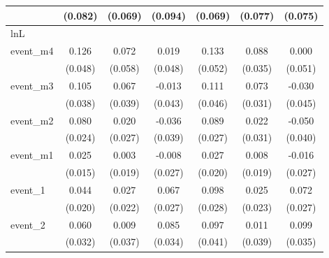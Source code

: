 {\begin{tabular}{l*{6}{c}}
            &     (0.082)         &     (0.069)         &     (0.094)         &     (0.069)         &     (0.077)         &     (0.075)         \\
\hline
lnL         &                     &                     &                     &                     &                     &                     \\
event\_m4    &       0.126\sym{**} &       0.072         &       0.019         &       0.133\sym{*}  &       0.088\sym{*}  &       0.000         \\
            &     (0.048)         &     (0.058)         &     (0.048)         &     (0.052)         &     (0.035)         &     (0.051)         \\
[1em]
event\_m3    &       0.105\sym{**} &       0.067         &      -0.013         &       0.111\sym{*}  &       0.073\sym{*}  &      -0.030         \\
            &     (0.038)         &     (0.039)         &     (0.043)         &     (0.046)         &     (0.031)         &     (0.045)         \\
[1em]
event\_m2    &       0.080\sym{***}&       0.020         &      -0.036         &       0.089\sym{***}&       0.022         &      -0.050         \\
            &     (0.024)         &     (0.027)         &     (0.039)         &     (0.027)         &     (0.031)         &     (0.040)         \\
[1em]
event\_m1    &       0.025         &       0.003         &      -0.008         &       0.027         &       0.008         &      -0.016         \\
            &     (0.015)         &     (0.019)         &     (0.027)         &     (0.020)         &     (0.019)         &     (0.027)         \\
[1em]
event\_1     &       0.044\sym{*}  &       0.027         &       0.067\sym{*}  &       0.098\sym{***}&       0.025         &       0.072\sym{**} \\
            &     (0.020)         &     (0.022)         &     (0.027)         &     (0.028)         &     (0.023)         &     (0.027)         \\
[1em]
event\_2     &       0.060         &       0.009         &       0.085\sym{*}  &       0.097\sym{*}  &       0.011         &       0.099\sym{**} \\
            &     (0.032)         &     (0.037)         &     (0.034)         &     (0.041)         &     (0.039)         &     (0.035)         \\

\end{tabular}}
